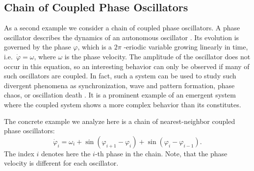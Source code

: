 \documentclass[final]{siamltex}
\begin{document}
%
%
\subsection{Chain of Coupled Phase Oscillators}

As a second example we consider a chain of coupled phase
oscillators. A phase oscillator describes the dynamics of an
autonomous oscillator \cite{PhaseOscillator}. Its evolution is
governed by the phase $\varphi$, which is a $2\pi$ -eriodic variable growing linearly
in time, i.e.~$\dot{\varphi} = \omega$, where $\omega$ is the phase
velocity. The amplitude of the oscillator does not occur in this
equation, so an interesting behavior can only be observed if many
of such oscillators are coupled. In fact, such a system can be used to
study such divergent phenomena as synchronization, wave and pattern
formation, phase chaos, or oscillation death
\cite{Synchronization-Pikovsky,Kuramoto-84}. It is a prominent example
of an emergent system where the coupled system shows a more complex
behavior than its constitutes.


The concrete example we analyze here is a chain of nearest-neighbor
coupled phase oscillators:
\begin{equation} \label{eq:phasesystem}
    \dot{\varphi}_i = \omega_i + \sin( \varphi_{i+1} - \varphi_i) + \sin( \varphi_i
    - \varphi_{i-1}).
\end{equation}
The index $i$ denotes here the $i$-th phase in the chain. Note, that
the phase velocity is different for each oscillator.
\end{document}

